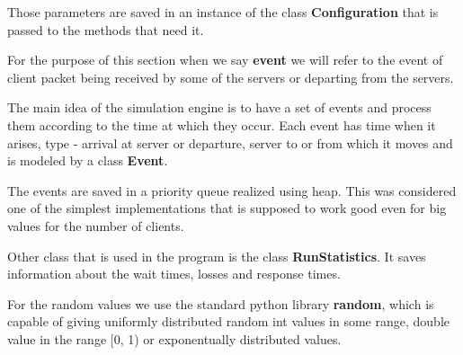 \documentclass[12pt]{article}
\theoremstyle{plain}
\begin{document}
Those parameters are saved in an instance of the class \textbf{Configuration}
that is passed to the methods that need it.

For the purpose of this section when we say \textbf{event} we will refer to the
event of client packet being received by some of the servers or departing from
the servers.

The main idea of the simulation engine is to have a set of events and process 
them according to the time at which they occur. Each event has time when it
arises, type - arrival at server or departure, server to or from which it moves
and is modeled by a class \textbf{Event}.

The events are saved in a priority queue realized using heap. This was
considered one of the simplest implementations that is supposed to work good 
even for big values for the number of clients.

Other class that is used in the program is the class \textbf{RunStatistics}. It
saves information about the wait times, losses and response times. 

For the random values we use the standard python library \textbf{random}, which
is capable of giving uniformly distributed random int values in some range,
double value in the range [0, 1) or exponentually distributed values.
\end{document}

